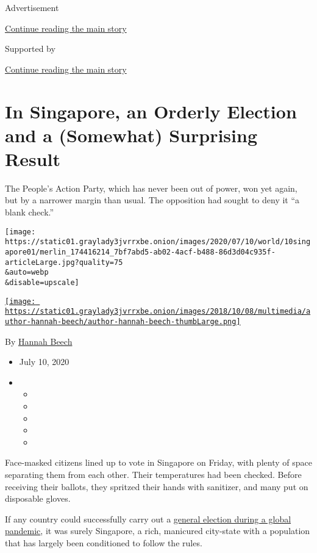 Advertisement

\protect\hyperlink{after-top}{Continue reading the main story}

Supported by

\protect\hyperlink{after-sponsor}{Continue reading the main story}

\hypertarget{in-singapore-an-orderly-election-and-a-somewhat-surprising-result}{%
\section{In Singapore, an Orderly Election and a (Somewhat) Surprising
Result}\label{in-singapore-an-orderly-election-and-a-somewhat-surprising-result}}

The People's Action Party, which has never been out of power, won yet
again, but by a narrower margin than usual. The opposition had sought to
deny it ``a blank check.''

\texttt{[image: https://static01.graylady3jvrrxbe.onion/images/2020/07/10/world/10singapore01/merlin\_174416214\_7bf7abd5-ab02-4acf-b488-86d3d04c935f-articleLarge.jpg?quality=75\\\&auto=webp\\\&disable=upscale]}

\href{https://www.nytimes3xbfgragh.onion/by/hannah-beech}{\texttt{[image: https://static01.graylady3jvrrxbe.onion/images/2018/10/08/multimedia/author-hannah-beech/author-hannah-beech-thumbLarge.png]}}

By \href{https://www.nytimes3xbfgragh.onion/by/hannah-beech}{Hannah
Beech}

\begin{itemize}
\item
  July 10, 2020
\item
  \begin{itemize}
  \item
  \item
  \item
  \item
  \item
  \end{itemize}
\end{itemize}

Face-masked citizens lined up to vote in Singapore on Friday, with
plenty of space separating them from each other. Their temperatures had
been checked. Before receiving their ballots, they spritzed their hands
with sanitizer, and many put on disposable gloves.

If any country could successfully carry out a
\href{https://www.nytimes3xbfgragh.onion/2020/06/23/world/asia/singapore-elections-coronavirus.html}{general
election during a global pandemic}, it was surely Singapore, a rich,
manicured city-state with a population that has largely been conditioned
to follow the rules.

